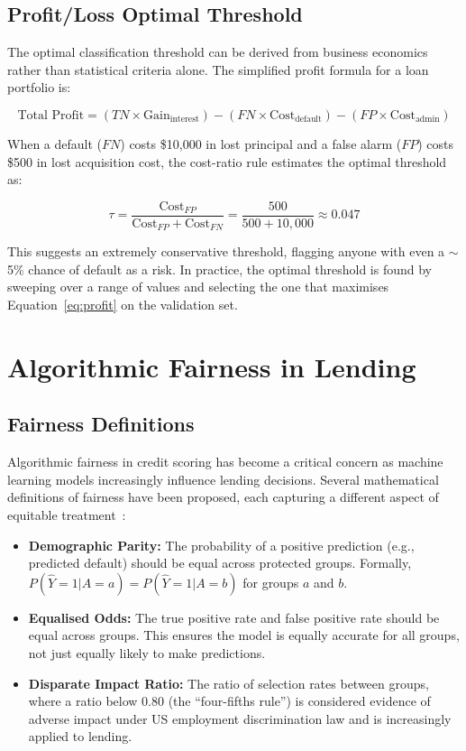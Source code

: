 \subsection{Profit/Loss Optimal Threshold}

The optimal classification threshold can be derived from business economics rather than statistical criteria alone. The simplified profit formula for a loan portfolio is:

\begin{equation}
\text{Total Profit} = (TN \times \text{Gain}_{\text{interest}}) - (FN \times \text{Cost}_{\text{default}}) - (FP \times \text{Cost}_{\text{admin}})
\label{eq:profit}
\end{equation}

When a default ($FN$) costs \$10,000 in lost principal and a false alarm ($FP$) costs \$500 in lost acquisition cost, the cost-ratio rule estimates the optimal threshold as:

\begin{equation}
\tau = \frac{\text{Cost}_{FP}}{\text{Cost}_{FP} + \text{Cost}_{FN}} = \frac{500}{500 + 10{,}000} \approx 0.047
\label{eq:threshold}
\end{equation}

This suggests an extremely conservative threshold, flagging anyone with even a $\sim$5\% chance of default as a risk. In practice, the optimal threshold is found by sweeping over a range of values and selecting the one that maximises Equation~\ref{eq:profit} on the validation set.

\section{Algorithmic Fairness in Lending}
\label{sec:fairness_lit}

\subsection{Fairness Definitions}

Algorithmic fairness in credit scoring has become a critical concern as machine learning models increasingly influence lending decisions. Several mathematical definitions of fairness have been proposed, each capturing a different aspect of equitable treatment~\cite{hardt2016}:

\begin{itemize}
    \item \textbf{Demographic Parity:} The probability of a positive prediction (e.g., predicted default) should be equal across protected groups. Formally, $P(\hat{Y}=1 | A=a) = P(\hat{Y}=1 | A=b)$ for groups $a$ and $b$.
    \item \textbf{Equalised Odds:} The true positive rate and false positive rate should be equal across groups. This ensures the model is equally accurate for all groups, not just equally likely to make predictions.
    \item \textbf{Disparate Impact Ratio:} The ratio of selection rates between groups, where a ratio below 0.80 (the ``four-fifths rule'') is considered evidence of adverse impact under US employment discrimination law and is increasingly applied to lending.
\end{itemize}

